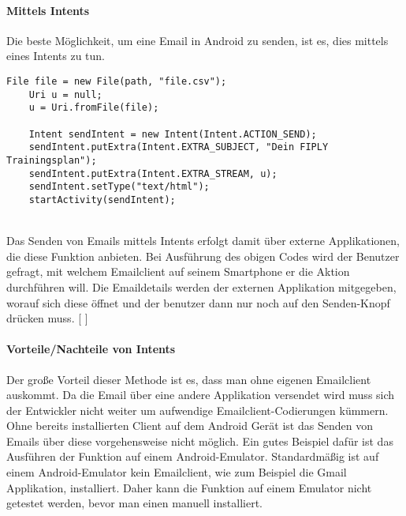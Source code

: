 \documentclass[FIPLY_base.tex]{subfiles}
\begin{document}
\paragraph{Mittels Intents}
Die beste Möglichkeit, um eine Email in Android zu senden, ist es, dies mittels eines Intents zu tun. 
\begin{lstlisting}[caption={Verwendung von CSVWriter: Möglichkeit 2, alles auf einmal},label=DescriptiveLabel]
    File file = new File(path, "file.csv");
    Uri u = null;
    u = Uri.fromFile(file);

    Intent sendIntent = new Intent(Intent.ACTION_SEND);
    sendIntent.putExtra(Intent.EXTRA_SUBJECT, "Dein FIPLY Trainingsplan");
    sendIntent.putExtra(Intent.EXTRA_STREAM, u);
    sendIntent.setType("text/html");
    startActivity(sendIntent);
\end{lstlisting}
\ \\
Das Senden von Emails mittels Intents erfolgt damit über externe Applikationen, die diese Funktion anbieten. Bei Ausführung des obigen Codes wird der Benutzer gefragt, mit welchem Emailclient auf seinem Smartphone er die Aktion durchführen will. Die Emaildetails werden der externen Applikation mitgegeben, worauf sich diese öffnet und der benutzer dann nur noch auf den \grqq{}Senden\grqq{}-Knopf drücken muss. [ \cite{exportCSVsendMail}]
\paragraph{Vorteile/Nachteile von Intents}
Der große Vorteil dieser Methode ist es, dass man ohne eigenen Emailclient auskommt. Da die Email über eine andere Applikation versendet wird muss sich der Entwickler nicht weiter um aufwendige Emailclient-Codierungen kümmern. 
\ \\
Ohne bereits installierten Client auf dem Android Gerät ist das Senden von Emails über diese vorgehensweise nicht möglich. Ein gutes Beispiel dafür ist das Ausführen der Funktion auf einem Android-Emulator. Standardmäßig ist auf einem Android-Emulator kein Emailclient, wie zum Beispiel die Gmail Applikation, installiert. Daher kann die Funktion auf einem Emulator nicht getestet werden, bevor man einen manuell installiert. 
\ \\
\end{document}
